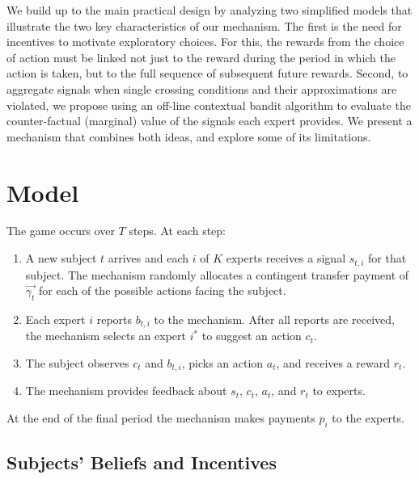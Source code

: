 


We build up to the main practical design by analyzing two simplified models that illustrate the two key characteristics of our mechanism. 
The first is the need for incentives to motivate exploratory choices.
For this, the rewards from the choice of action must be linked not just to the reward during the period in which the action is taken, but to the full sequence of subsequent future rewards.
Second, to aggregate signals when single crossing conditions and their approximations are violated, we propose using an off-line contextual bandit algorithm to evaluate the counter-factual (marginal) value of the signals each expert provides.
We present a mechanism that combines both ideas, and explore some of its limitations.



\section{Model}

The game occurs over $T$ steps. At each step: 

\begin{enumerate}
\item A new subject $t$ arrives and each $i$ of $K$ experts receives a signal $s_{t,i}$ for that subject. The mechanism  randomly allocates a contingent transfer payment of $\vec{\gamma_t}$ for each of the possible actions facing the subject. %
\item Each expert $i$ reports ${b}_{t,i}$ to the mechanism. After all reports are received, the mechanism selects an expert $i^{*}$ to suggest an action $c_t$.
\item The subject observes $c_t$ and ${b}_{t,i}$, picks an action $a_t$, and receives a reward $r_t$. %
\item The mechanism provides feedback about $s_t$, $c_t$, $a_t$, and $r_t$ to experts. %
\end{enumerate}

At the end of the final period the mechanism makes payments $p_i$ to the experts.


\subsection{Subjects' Beliefs and Incentives}


